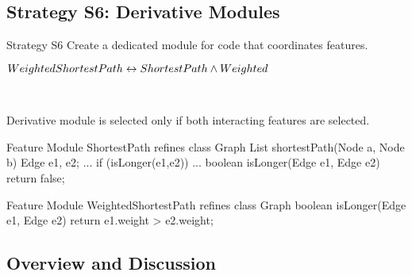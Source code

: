 \subsection{Strategy S6: Derivative Modules}

\begin{frame}{\myframetitle}
	\begin{fancycolumns}[widths={30},animation=none]
		\begin{definition}{Strategy S6}
			Create a dedicated module for code that coordinates features.
		\end{definition}
	\nextcolumn
	\end{fancycolumns}
\end{frame}

\begin{frame}[fragile]{\myframetitle}
	\begin{fancycolumns}[animation=none]
		\centering

		$WeightedShortestPath \leftrightarrow ShortestPath \wedge Weighted$

		~
		\begin{note}{}
			Derivative module is selected only if both interacting features are selected.
		\end{note}
	\nextcolumn
\begin{codetight}{Feature Module ShortestPath}
refines class Graph {
	List shortestPath(Node a, Node b){
		Edge e1, e2;
		...
		if (isLonger(e1,e2)) 
		... 
	}
	boolean isLonger(Edge e1, Edge e2){
		return false;
	}
}
\end{codetight}	
\begin{codetight}{Feature Module WeightedShortestPath}
refines class Graph {
	boolean isLonger(Edge e1, Edge e2){
		return e1.weight > e2.weight;
	}
}
\end{codetight}	
	\end{fancycolumns}
\end{frame}

\subsection{Overview and Discussion}

\begin{frame}[label=HandlingFeatureInteractions]{\myframetitle}
	\centering{} %
\end{frame}
